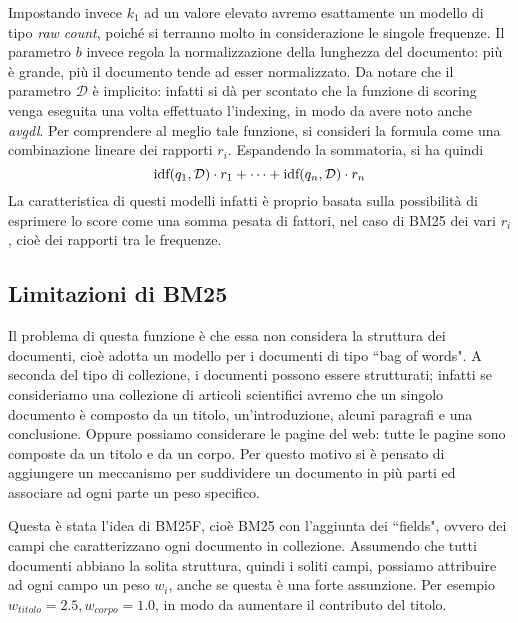 Impostando invece $k_1$ ad un valore elevato avremo esattamente un modello di tipo \textit{raw count}, poiché
si terranno molto in considerazione le singole frequenze.
Il parametro $b$ invece regola la normalizzazione della lunghezza del documento: più è grande,
più il documento tende ad esser normalizzato.
Da notare che il parametro $\mathcal{D}$ è implicito: infatti si dà per scontato che
la funzione di scoring venga
eseguita una volta effettuato l'indexing, in modo da avere noto anche \textit{avgdl}.
Per comprendere al meglio tale funzione, si consideri la formula come una combinazione
lineare dei rapporti $r_i$. Espandendo la sommatoria, si ha quindi
$$
\text{idf}(q_1, \mathcal{D}) \cdot r_1 + \dots + \text{idf}(q_n, \mathcal{D}) \cdot r_n
$$
La caratteristica di questi modelli infatti è proprio basata sulla possibilità di esprimere lo score come una somma pesata
di fattori, nel caso di BM25 dei vari $r_i$,  cioè dei rapporti tra le frequenze.

\subsection{Limitazioni di BM25}

Il problema di questa funzione è che essa non considera la struttura dei documenti, cioè adotta un modello
per i documenti di tipo ``bag of words".
A seconda del tipo di collezione, i documenti possono essere strutturati; infatti
se consideriamo una collezione di articoli scientifici avremo che un singolo documento è composto da un titolo, 
un'introduzione, alcuni paragrafi e una conclusione.
Oppure possiamo considerare le pagine del web: tutte le pagine sono composte da un titolo e da un corpo.
Per questo motivo si è pensato di aggiungere un meccanismo per suddividere un documento in
più parti ed associare ad ogni parte un peso specifico.

Questa è stata l'idea di BM25F, cioè BM25 con l'aggiunta dei ``fields", ovvero dei campi che caratterizzano ogni documento in collezione.
Assumendo che tutti documenti abbiano la solita struttura, quindi i soliti campi,
possiamo attribuire ad ogni campo un peso  $w_i$, anche se questa è una forte assunzione.
Per esempio $w_{titolo} = 2.5, w_{corpo} = 1.0$, in modo da aumentare il contributo del titolo.

\pagebreak


